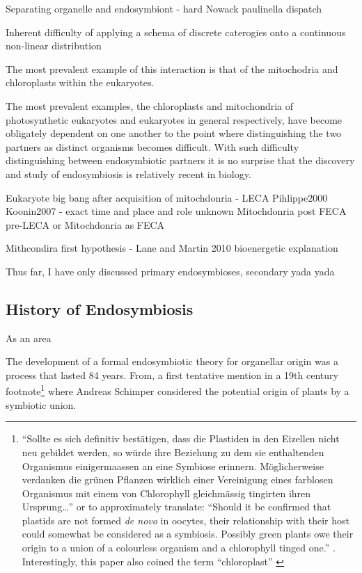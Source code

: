 

Separating organelle and endosymbiont - hard \citep{Keeling2008} Nowack paulinella dispatch

Inherent difficulty of applying a schema of discrete caterogies onto a continuous non-linear distribution



The most prevalent example of this interaction is that of the mitochodria and chloroplasts 
within the eukaryotes.

The most prevalent examples, the chloroplasts and mitochondria of photosynthetic eukaryotes and 
eukaryotes in general respectively, have become obligately dependent on one another to the point where distinguishing 
the two partners as distinct organisms becomes difficult.
With such difficulty distinguishing between endosymbiotic partners it is no 
surprise that the discovery and study of endosymbiosis is relatively recent in 
biology. 



Eukaryote big bang after acquisition of mitochdonria - LECA Pihlippe2000 Koonin2007 - exact time and place and role unknown
Mitochdonria post FECA pre-LECA or Mitochdonria as FECA

Mithcondira first hypothesis - Lane and Martin 2010 bioenergetic explanation




Thus far, I have only discussed primary endosymbioses, secondary yada yada







\subsection{History of Endosymbiosis}

As an area 


The development of a formal endosymbiotic theory for organellar origin was a process that
lasted 84 years. From, a first tentative mention in a 19th century footnote\footnote{``Sollte es sich definitiv best\"atigen, dass die Plastiden in den 
Eizellen nicht neu gebildet werden, so w\"urde ihre Beziehung zu dem sie 
enthaltenden Organismus einigermaassen an eine Symbiose erinnern. M\"oglicherweise
verdanken die gr\"unen Pflanzen wirklich einer Vereinigung eines farblosen Organismus
mit einem von Chlorophyll gleichm\"assig tingirten ihren Ursprung\ldots''
\citep{Schimper1883} or to approximately translate: ``Should it be confirmed
that plastids are not formed \textit{de novo} in oocytes, their relationship with
their host could somewhat be considered as a symbiosis.  Possibly green plants owe
their origin to a union of a colourless organism and a chlorophyll tinged one.''
\citep{Neuhauser2014}. Interestingly, this paper also coined the term ``chloroplast'' \citep{Sapp2002}} 
where Andreas Schimper considered the potential origin of plants by a symbiotic union. 


